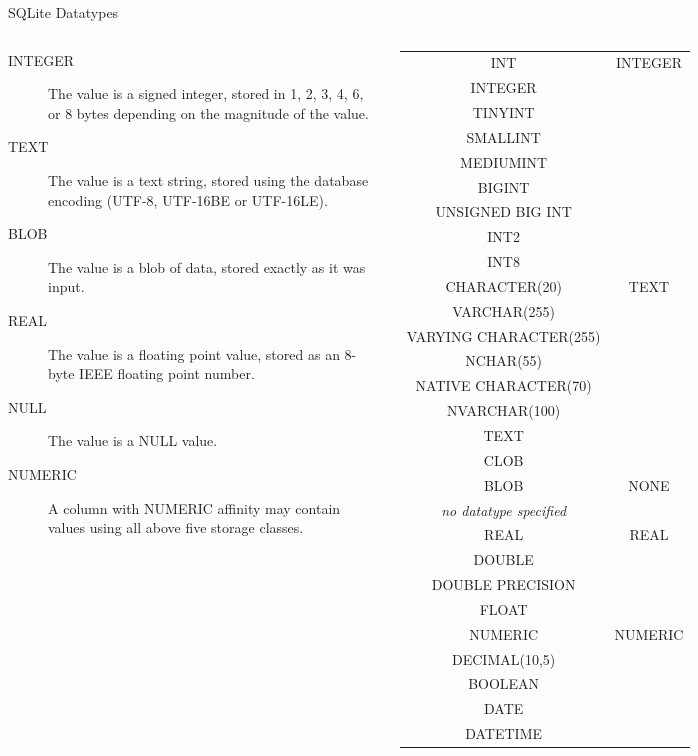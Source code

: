 \documentclass{beamer}
\begin{document}
\begin{frame}{SQLite Datatypes}

\begin{columns}
 \scriptsize

\begin{description}
\item[INTEGER] The value is a signed integer, stored in 1, 2, 3, 4, 6, or 8 bytes depending on the magnitude of the value.
\item[TEXT] The value is a text string, stored using the database encoding (UTF-8, UTF-16BE or UTF-16LE).
\item[BLOB] The value is a blob of data, stored exactly as it was input.
\item[REAL] The value is a floating point value, stored as an 8-byte IEEE floating point number.
\item[NULL] The value is a NULL value.
\item[NUMERIC] A column with NUMERIC affinity may contain values using all above five storage classes.
\end{description}

\vspace{2.5mm}

{ \tiny
\begin{tabular}{|c|c|}
\hline
INT & \multirow{9}{*}{INTEGER} \\
INTEGER & \\
TINYINT & \\
SMALLINT & \\
MEDIUMINT & \\
BIGINT & \\
UNSIGNED BIG INT & \\
INT2 & \\
INT8 & \\
\hline
CHARACTER(20) & \multirow{8}{*}{TEXT} \\
VARCHAR(255) & \\
VARYING CHARACTER(255) & \\
NCHAR(55) & \\
NATIVE CHARACTER(70) & \\
NVARCHAR(100) & \\
TEXT & \\
CLOB & \\
\hline
BLOB & \multirow{2}{*}{NONE} \\
\textit{no datatype specified} & \\
\hline
REAL & \multirow{4}{*}{REAL} \\
DOUBLE & \\
DOUBLE PRECISION & \\
FLOAT & \\
\hline
NUMERIC & \multirow{5}{*}{NUMERIC} \\ 
DECIMAL(10,5) & \\
BOOLEAN & \\
DATE & \\
DATETIME & \\
\hline
\end{tabular}
}

\end{columns}
\end{frame}
\end{document}
